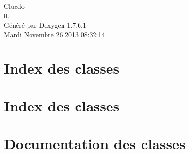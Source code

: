 \documentclass[a4paper]{book}
\begin{document}
\hypersetup{pageanchor=false,citecolor=blue}
\begin{titlepage}
\vspace*{7cm}
\begin{center}
{\Large \-Cluedo \\[1ex]\large 0. }\\
\vspace*{1cm}
{\large \-Généré par Doxygen 1.7.6.1}\\
\vspace*{0.5cm}
{\small Mardi Novembre 26 2013 08:32:14}\\
\end{center}
\end{titlepage}
\clearemptydoublepage
{}
\tableofcontents
\clearemptydoublepage
{}
\hypersetup{pageanchor=true,citecolor=blue}
\chapter{\-Index des classes}

\chapter{\-Index des classes}

\chapter{\-Documentation des classes}





























\printindex
\end{document}
